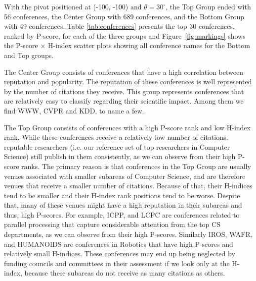 \documentclass[notitlepage]{svjour3}
\begin{document}
With the pivot positioned at (-100, -100) and $ \theta=30^{\circ} $, the Top Group ended with 56 conferences, the 
Center Group with 689 conferences, and the Bottom Group with 49 conferences. Table 
\ref{tab:conferences} presents the top 30 conferences, ranked by P-score, for each of the three groups
and Figure~\ref{fig:markings} shows the P-score $ \times $ H-index scatter plots showing all conference
names for the Bottom and Top groups.

The Center Group consists of conferences that have a high correlation between reputation and
popularity. The reputation of these conferences is well represented by the number of citations
they receive. This group represents conferences that are relatively easy to classify regarding
their scientific impact. Among them we find WWW, CVPR and KDD, to name a few.

The Top Group consists of conferences with a high P-score rank and low H-index rank. While these conferences
receive a relatively low number of citations, reputable researchers 
(i.e. our reference set of top researchers in Computer Science) still publish 
in them consistently, as we can observe from their high P-score ranks. The primary reason is that
conferences in the Top Group are usually venues associated with smaller subareas of Computer Science, 
and are therefore venues that receive a smaller number of citations. Because of that, their H-indices 
tend to be smaller and their H-index rank positions tend to be worse. Despite that, many of these 
venues might have a high reputation in their subareas and thus, high P-scores. 
For example, ICPP, and LCPC are conferences related to parallel processing that capture
considerable attention from the top CS departments, as we can observe from their high P-scores. 
Similarly IROS, WAFR, and HUMANOIDS are conferences in Robotics that have high P-scores
and relatively small H-indices. These conferences may end up being neglected by funding councils and 
committees in their assessment if we look only at the H-index, because these subareas do not receive 
as many citations as others.

\end{document}
